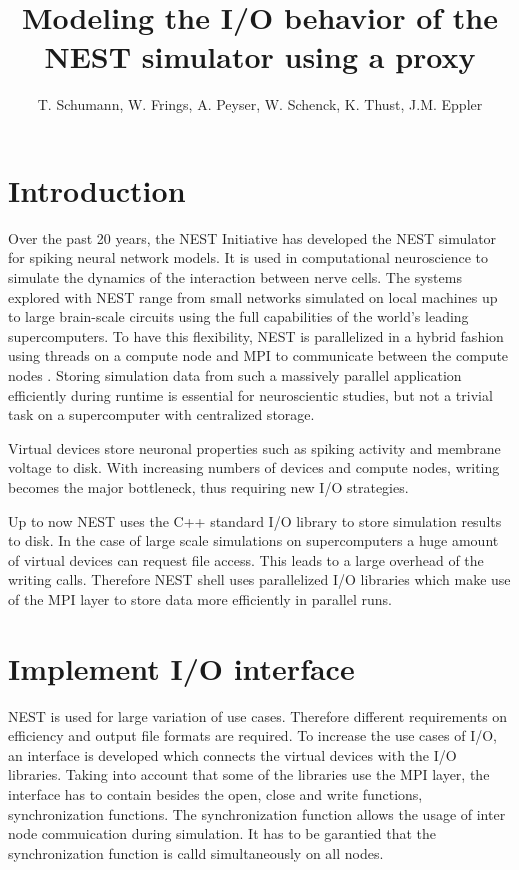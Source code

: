\documentclass[]{YIC2015}
\title{Modeling the I/O behavior of the NEST simulator using a proxy}
\author[T. Schumann et al.]{%
  T. Schumann\authref{a}\corref,
  W. Frings\authref{b},
  A. Peyser\authref{c},
  W. Schenck\authref{c},
  K. Thust\authref{b},
  J.M. Eppler\authref{c}
}
\begin{document}
\maketitle

\section{Introduction}
%
Over the past 20 years, the NEST Initiative \cite{NESTInitiative} has developed the NEST
\cite{NEST} simulator for spiking neural network models. It is used in
computational neuroscience to simulate the dynamics of the interaction
between nerve cells. The systems explored with NEST range from small
networks simulated on local machines up to large brain-scale circuits
using the full capabilities of the world's leading supercomputers. To
have this flexibility, NEST is parallelized in a hybrid fashion
using threads on a compute node and MPI to communicate between the
compute nodes \cite{Plesser07}.  Storing simulation data from such a
massively parallel application efficiently during runtime is essential
for neuroscientic studies, but not a trivial task on a supercomputer
with centralized storage.

Virtual devices store neuronal properties such as spiking activity
and membrane voltage to disk. With increasing numbers of devices and
compute nodes, writing becomes the major bottleneck, thus requiring
new I/O strategies.

Up to now NEST uses the C++ standard I/O library to store simulation results to disk.
In the case of large scale simulations on supercomputers a huge amount of virtual devices can request file access.
This leads to a large overhead of the writing calls.
Therefore NEST shell uses parallelized I/O libraries which make use of the MPI layer to store data more efficiently in parallel runs.
\section{Implement I/O interface}
NEST is used for large variation of use cases.
Therefore different requirements on efficiency and output file formats are required.
To increase the use cases of I/O, an interface is developed which connects the virtual devices with the I/O libraries.
Taking into account that some of the libraries use the MPI layer,
the interface has to contain besides the open, close and write functions, synchronization functions.
The synchronization function allows the usage of inter node commuication during simulation.
It has to be garantied that the synchronization function is calld simultaneously on all nodes.
\end{document}
